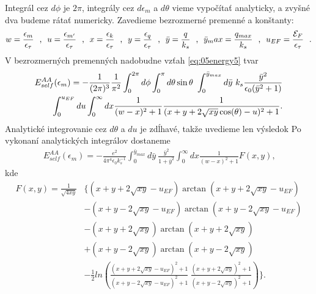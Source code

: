 Integrál cez $d\phi$ je $2\pi$, integrály cez $d\epsilon_m$ a $d\theta$ vieme vypočítať analyticky, a zvyšné dva budeme rátať numericky. Zavedieme bezrozmerné premenné a konštanty:
\begin{equation}
w=\frac{\epsilon_m}{\epsilon_\tau} \ \ \text{,} \ \
u=\frac{\epsilon_{m'}}{\epsilon_\tau} \ \ \text{,} \ \
x=\frac{\epsilon_k}{\epsilon_\tau} \ \ \text{,} \ \
y=\frac{\epsilon_q}{\epsilon_\tau} \ \ \text{,} \ \
\bar{y}=\frac{q}{k_s}  \ \   \text{,} \ \
\bar{y}_max=\frac{q_{max}}{k_s}  \ \ \text{,} \ \
u_{EF}=\frac{\E_F}{\epsilon_\tau}  \ \ \text{.}
\end{equation}
V bezrozmerných premenných nadobudne vzťah \eqref{eq:05energy5} tvar
\begin{align}
\notag
E_{self}^{AA}(\epsilon_m)= - \frac{1}{(2\pi)^3}\frac{1}{\pi^2}\int_0^{2\pi}d\phi \int_0^\pi d\theta \sin\theta \ \int_0^{\bar{y}_{max}} d\bar{y}\ k_s \frac{\bar{y}^2}{\epsilon_0(\bar{y}^2+1)}\\
\int_0^{u_{EF}} du \int_0^{\infty} dx \frac{1}{(w-x)^2+1}\frac{1}{(x+y+2\sqrt{xy}\cos(\theta)-u)^2+1} \text{.}
\end{align}
Analytické integrovanie cez $d\theta$ a $du$ je zdĺhavé, takže uvedieme len výsledok Po vykonaní analytických integrálov dostaneme
\begin{align}
\label{eq:05energy6}
E_{self}^{AA}(\epsilon_m)= -\frac{e^2}{4\pi^4\epsilon_0 k_s^{-1}} \int_0^{\bar y_{max}} d\bar{y}\ \frac{\bar{y}^2}{1+\bar{y}^2}\int_0^{\infty} dx \frac{1}{(w-x)^2+1}F(x,y) \text{,}
\end{align}
kde
\begin{align*}
F(x,y)=\frac{1}{\sqrt{4xy}}& \{(x+y+2\sqrt{xy}-u_{EF})\arctan(x+y+2\sqrt{xy}-u_{EF}) \\
&-(x+y-2\sqrt{xy}-u_{EF})\arctan(x+y-2\sqrt{xy}-u_{EF}) \\
&-(x+y+2\sqrt{xy})\arctan(x+y+2\sqrt{xy}) \\
&+(x+y-2\sqrt{xy})\arctan(x+y-2\sqrt{xy}) \\
&-\frac{1}{2}ln(\frac{(x+y+2\sqrt{xy}-u_{EF})^2+1}{(x+y-2\sqrt{xy}-u_{EF})^2+1}\ \frac{(x+y+2\sqrt{xy})^2+1}{(x+y-2\sqrt{xy})^2+1})\}\text{.}
\end{align*}

